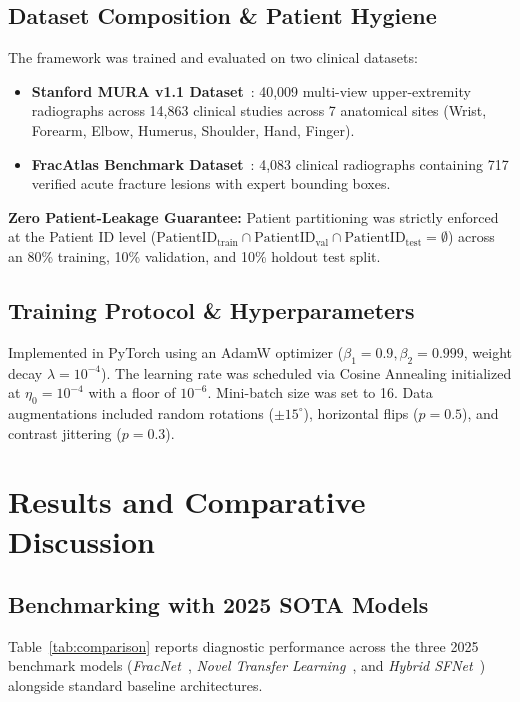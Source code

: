 \documentclass[3p,twocolumn]{elsarticle}
\begin{document}
\subsection{Dataset Composition \& Patient Hygiene}
The framework was trained and evaluated on two clinical datasets:
\begin{itemize}
    \item \textbf{Stanford MURA v1.1 Dataset}~\cite{rajpurkar2017mura}: 40,009 multi-view upper-extremity radiographs across 14,863 clinical studies across 7 anatomical sites (Wrist, Forearm, Elbow, Humerus, Shoulder, Hand, Finger).
    \item \textbf{FracAtlas Benchmark Dataset}~\cite{fracatlas2023}: 4,083 clinical radiographs containing 717 verified acute fracture lesions with expert bounding boxes.
\end{itemize}
\textbf{Zero Patient-Leakage Guarantee:} Patient partitioning was strictly enforced at the Patient ID level ($\text{PatientID}_{\text{train}} \cap \text{PatientID}_{\text{val}} \cap \text{PatientID}_{\text{test}} = \emptyset$) across an 80\% training, 10\% validation, and 10\% holdout test split.

\subsection{Training Protocol \& Hyperparameters}
Implemented in PyTorch using an AdamW optimizer ($\beta_1 = 0.9, \beta_2 = 0.999$, weight decay $\lambda = 10^{-4}$). The learning rate was scheduled via Cosine Annealing initialized at $\eta_0 = 10^{-4}$ with a floor of $10^{-6}$. Mini-batch size was set to 16. Data augmentations included random rotations ($\pm 15^\circ$), horizontal flips ($p=0.5$), and contrast jittering ($p=0.3$).

\section{Results and Comparative Discussion}

\subsection{Benchmarking with 2025 SOTA Models}
Table~\ref{tab:comparison} reports diagnostic performance across the three 2025 benchmark models (\textit{FracNet}~\cite{fracnet2025}, \textit{Novel Transfer Learning}~\cite{noveltransfer2025}, and \textit{Hybrid SFNet}~\cite{sfnet2025}) alongside standard baseline architectures.
\end{document}
